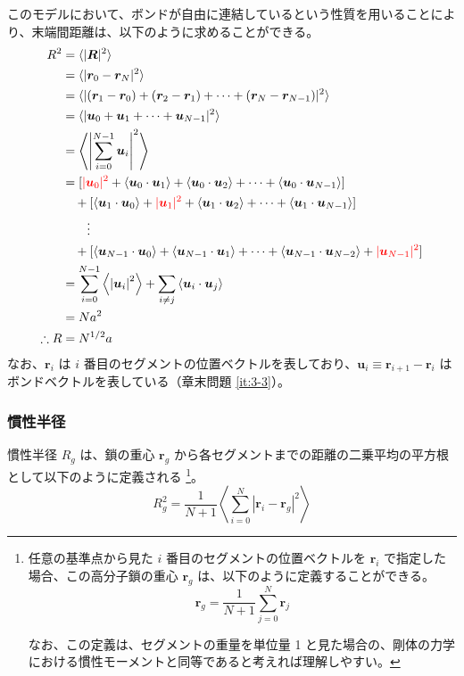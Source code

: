 \documentclass[a4paper,11pt]{jlreq}
\begin{document}
このモデルにおいて、ボンドが自由に連結しているという性質を用いることにより、末端間距離は、以下のように求めることができる。
\begin{align}
R^2
	&= \langle |\bm{R}|^2 \rangle \notag \\
	&=\langle |\bm{r}_0 - \bm{r}_N|^2 \rangle \notag \\
	&=\langle |(\bm{r}_1 - \bm{r}_0) + (\bm{r}_2 - \bm{r}_1) + \cdots + (\bm{r}_N - \bm{r}_{N-1})|^2 \rangle \notag \\
	&=\langle |\bm{u}_0 + \bm{u}_1 + \cdots + \bm{u}_{N-1}|^2 \rangle \notag \\
	&=\left\langle \left|\sum_{i=0}^{N-1}\bm{u}_i \right|^2 \right\rangle \notag \\
	&= 
		[ 
		{\color{red} |\bm{u}_0|^2} + \langle \bm{u}_0 \cdot \bm{u}_1 \rangle + \langle \bm{u}_0 \cdot \bm{u}_2 \rangle + \cdots + \langle \bm{u}_0 \cdot \bm{u}_{N-1} \rangle 
		] \notag \\
	&\quad+ 
		[ 
		\langle \bm{u}_1 \cdot \bm{u}_0 \rangle + {\color{red} |\bm{u}_1|^2} + \langle \bm{u}_1 \cdot \bm{u}_2 \rangle + \cdots + \langle \bm{u}_1 \cdot \bm{u}_{N-1} \rangle 
		] \notag \\
	&\quad\quad \vdots \notag \\
	&\quad+ 
		[ 
		\langle \bm{u}_{N-1} \cdot \bm{u}_0 \rangle + \langle \bm{u}_{N-1} \cdot \bm{u}_1 \rangle + \cdots + \langle \bm{u}_{N-1} \cdot \bm{u}_{N-2} \rangle + {\color{red} |\bm{u}_{N-1}|^2} 
		] \notag \\
	&=\sum_{i=0}^{N-1} \left\langle \left|\bm{u}_i \right|^2 \right\rangle 
	+\sum_{i \neq j} \left\langle \bm{u}_i \cdot \bm{u}_j \right\rangle \notag \\
	&= N a^2 \notag \\
\therefore R &= N^{1/2}a
\label{eq:r2}
\end{align}
なお、$\bm{r}_i$ は $i$ 番目のセグメントの位置ベクトルを表しており、$\bm{u}_i \equiv \bm{r}_{i+1} - \bm{r}_i$ はボンドベクトルを表している（章末問題 \ref{it:3-3}）。

\subsubsection{慣性半径}

慣性半径 $R_g$ は、鎖の重心 $\bm{r}_g$ から各セグメントまでの距離の二乗平均の平方根として以下のように定義される
\footnote
{
任意の基準点から見た $i$ 番目のセグメントの位置ベクトルを $\bm{r}_i$ で指定した場合、この高分子鎖の重心 $\bm{r}_g$ は、以下のように定義することができる。
\begin{equation*}
\bm{r}_g = \dfrac{1}{N+1} \sum_{j=0}^{N} \bm{r}_j
\end{equation*}

なお、この定義は、セグメントの重量を単位量 1 と見た場合の、剛体の力学における慣性モーメントと同等であると考えれば理解しやすい。
}。
\begin{equation*}
R_g^2 = \dfrac{1}{N+1} \left\langle \sum_{i=0}^{N} |\bm{r}_i - \bm{r}_g|^2 \right\rangle
\end{equation*}
\end{document}
